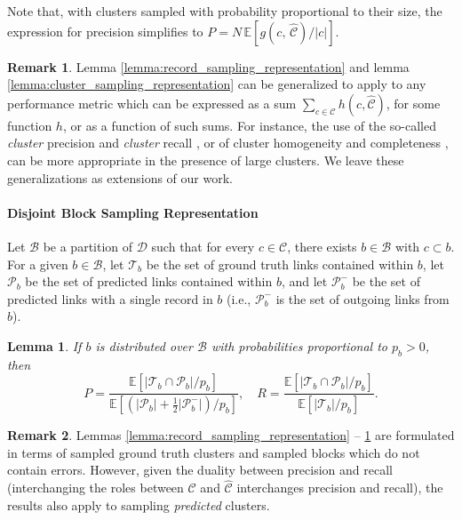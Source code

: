 \documentclass[fontsize=11pt]{article}
\newtheorem{lemma}{Lemma}
\theoremstyle{definition}
\newtheorem{remark}{Remark}
\begin{document}
Note that, with clusters sampled with probability proportional to their size, the expression for precision simplifies to
$
    P = N\, \mathbb{E} \left[ g(c,\, \widehat{\mathcal{C}})/\lvert c \rvert \right].
$

\begin{remark}
    Lemma \ref{lemma:record_sampling_representation} and lemma \ref{lemma:cluster_sampling_representation} can be generalized to apply to any performance metric which can be expressed as a sum $\sum_{c \in \mathcal{C}} h(c, \widehat{\mathcal{C}})$, for some function $h$, or as a function of such sums. For instance, the use of the so-called \textit{cluster} precision and \textit{cluster} recall \citep{Barnes2015}, or of cluster homogeneity and completeness \citep{Barnes2015}, can be more appropriate in the presence of large clusters. We leave these generalizations as extensions of our work.
\end{remark}

\paragraph{Disjoint Block Sampling Representation}

Let $\mathcal{B}$ be a partition of $\mathcal{D}$ such that for every $ c \in \mathcal{C}$, there exists $b \in \mathcal{B}$ with $c \subset b$. For a given $b \in \mathcal{B}$, let $\mathcal{T}_b$ be the set of ground truth links contained within $b$, let $\mathcal{P}_b$ be the set of predicted links contained within $b$, and let $\mathcal{P}_b^{-}$ be the set of predicted links with a single record in $b$ (i.e., $\mathcal{P}_b^{-}$ is the set of outgoing links from $b$).

\begin{lemma}\label{lemma:block_sampling_representation}
If $b$ is distributed over $\mathcal{B}$ with probabilities proportional to $p_b > 0$, then
\begin{equation}\label{eq:lemma_3}
    P = \frac{\mathbb{E}\left[ \lvert \mathcal{T}_b \cap \mathcal{P}_b \rvert / p_b \right]}{\mathbb{E}\left[ (\lvert \mathcal{P}_b \rvert + \tfrac{1}{2} \lvert \mathcal{P}_b^{-} \rvert)/p_b \right]}, \quad R = \frac{\mathbb{E}\left[ \lvert \mathcal{T}_b \cap \mathcal{P}_b \rvert / p_b \right]}{\mathbb{E}\left[ \lvert \mathcal{T}_b \rvert / p_b \right]}.
\end{equation}
\end{lemma}

\begin{remark}
    Lemmas \ref{lemma:record_sampling_representation} -- \ref{lemma:block_sampling_representation} are formulated in terms of sampled ground truth clusters and sampled blocks which do not contain errors. However, given the duality between precision and recall (interchanging the roles between $\mathcal{C}$ and $\widehat{\mathcal{C}}$  interchanges precision and recall), the results also apply to sampling \textit{predicted} clusters.
\end{remark}
\end{document}
